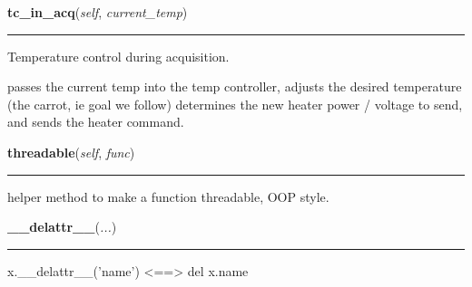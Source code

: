     \label{dsp:DspThread:tc_in_acq}

    \vspace{0.5ex}

    \begin{boxedminipage}{\textwidth}

    \raggedright \textbf{tc\_in\_acq}(\textit{self}, \textit{current\_temp})

    \vspace{-1.5ex}

    \rule{\textwidth}{0.5\fboxrule}
    Temperature control during acquisition.

    passes the current temp into the temp controller, adjusts the desired 
    temperature (the carrot, ie goal we follow) determines the new heater 
    power / voltage to send, and sends the heater command.

    \vspace{1ex}

    \end{boxedminipage}

    \label{dsp:DspThread:threadable}

    \vspace{0.5ex}

    \begin{boxedminipage}{\textwidth}

    \raggedright \textbf{threadable}(\textit{self}, \textit{func})

    \vspace{-1.5ex}

    \rule{\textwidth}{0.5\fboxrule}
    helper method to make a function threadable, OOP style.

    \vspace{1ex}

    \end{boxedminipage}

    \label{object:__delattr__}

    \vspace{0.5ex}

    \begin{boxedminipage}{\textwidth}

    \raggedright \textbf{\_\_delattr\_\_}(\textit{...})

    \vspace{-1.5ex}

    \rule{\textwidth}{0.5\fboxrule}
    x.\_\_delattr\_\_('name') {\textless}=={\textgreater} del x.name

    \vspace{1ex}

    \end{boxedminipage}

